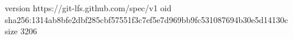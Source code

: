 version https://git-lfs.github.com/spec/v1
oid sha256:1314ab8bfe2dbf285cbf57551f3c7ef5e7d969bb9fc531087694b30e5d14130c
size 3206
